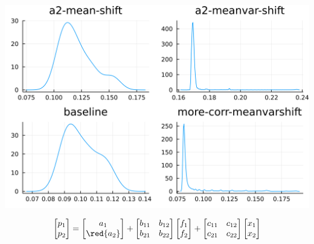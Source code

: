 \documentclass[
  ignorenonframetext,
]{beamer}
\begin{document}
\begin{frame}{}
\protect\hypertarget{section-5}{}
\begin{center}\includegraphics[width=0.95\paperheight]{complexity_files/figure-beamer/unnamed-chunk-26-1} \end{center}

\[
\begin{bmatrix}
 p_1 \\ p_2
\end{bmatrix} =
\begin{bmatrix}
 a_1 \\ \red{a_2}
\end{bmatrix}
 + 
 \begin{bmatrix}
 b_{11} & b_{12} \\
 b_{21} & b_{22}
\end{bmatrix}
\begin{bmatrix}
 f_1 \\ f_2
\end{bmatrix}
+
 \begin{bmatrix}
 c_{11} & c_{12} \\
 c_{21} & c_{22}
\end{bmatrix}
\begin{bmatrix}
 x_1 \\ x_2
\end{bmatrix}
\]
\end{frame}
\end{document}
